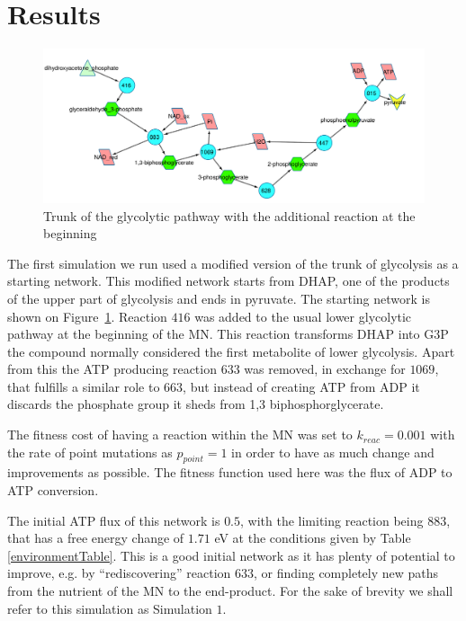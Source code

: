 \documentclass[a4paper,12pt]{article}
\begin{document}
\section{Results}
\label{sec:results}

\begin{figure}[htpb]
	\centering
	\includegraphics[width=1\linewidth]{trunk_glyc_init_large.pdf}
	\caption{Trunk of the glycolytic pathway with the additional reaction at the beginning}
	\label{fig:truncglycinit}
\end{figure}

The first simulation we run used a modified version of the trunk of glycolysis as a starting network. This modified network starts from DHAP, one of the products of the upper part of glycolysis and ends in pyruvate. The starting network is shown on Figure~\ref{fig:truncglycinit}. Reaction $416$ was added to the usual lower glycolytic pathway at the beginning of the MN. This reaction transforms DHAP into G3P the compound normally considered the first metabolite of lower glycolysis. Apart from this the ATP producing reaction $633$ was removed, in exchange for $1069$, that fulfills a similar role to $663$, but instead of creating ATP from ADP it discards the phosphate group it sheds from 1,3 biphosphorglycerate.

The fitness cost of having a reaction within the MN was set to $k_{reac}=0.001$ with the rate of point mutations as $p_{point}=1$ in order to have as much change and improvements as possible. The fitness function used here was the flux of ADP to ATP conversion.

The initial ATP flux of this network is $0.5$, with the limiting reaction being $883$, that has a free energy change of $1.71$ eV at the conditions given by Table \ref{environmentTable}. This is a good initial network as it has plenty of potential to improve, e.g. by ``rediscovering'' reaction $633$, or finding completely new paths from the nutrient of the MN to the end-product. For the sake of brevity we shall refer to this simulation as Simulation $1$.
\end{document}
